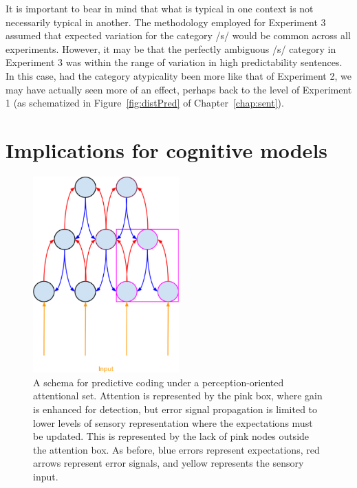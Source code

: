 It is important to bear in mind that what is typical in one context is not necessarily typical in another.  
The methodology employed for Experiment 3 assumed that expected variation for the category /s/ would be common across all experiments.  
However, it may be that the perfectly ambiguous /s/ category in Experiment 3 was within the range of variation in high predictability sentences. 
In this case, had the category atypicality been more like that of Experiment 2, we may have actually seen more of an effect, perhaps back to the level of Experiment 1 (as schematized in Figure~\ref{fig:distPred} of Chapter~\ref{chap:sent}).

\section{Implications for cognitive models}

\begin{figure}[!ht]
\caption{A schema for predictive coding under a perception-oriented attentional set.  Attention is represented by the pink box, where gain is enhanced for detection, but error signal propagation is limited to lower levels of sensory representation where the expectations must be updated.  This is represented by the lack of pink nodes outside the attention box.  As before, blue errors represent expectations, red arrows represent error signals, and yellow represents the sensory input.}
\label{fig:predictivecodingperception2}
\begin{center}
\includegraphics[width=0.5\textwidth]{pictures/perception_predictive_coding}
\end{center}
\end{figure}

